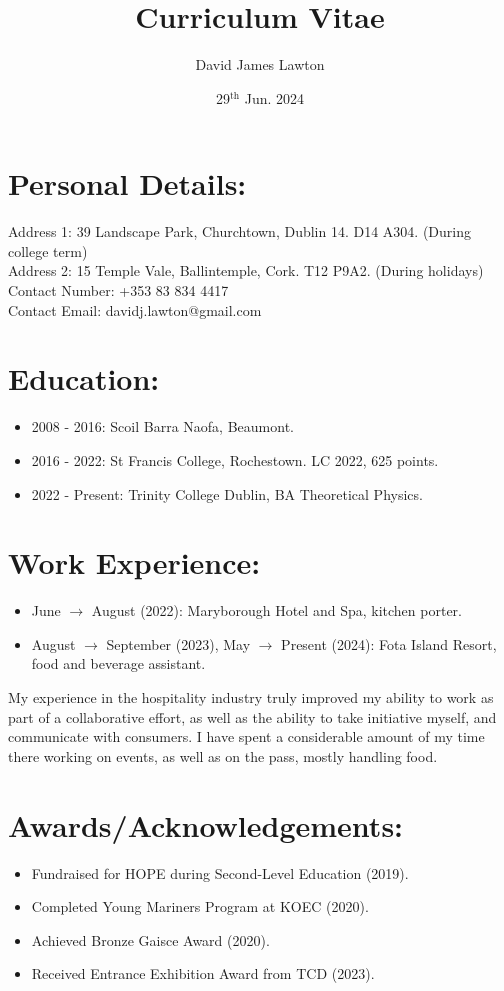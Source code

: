 \documentclass{article}
\title{Curriculum Vitae}
\author{David James Lawton}
\date{29$^\text{th}$ Jun. 2024}
\begin{document}
\maketitle

\section{Personal Details:}
Address 1: 39 Landscape Park, Churchtown, Dublin 14. D14 A304. (During college term)\\
Address 2: 15 Temple Vale, Ballintemple, Cork. T12 P9A2. (During holidays)\\
Contact Number: +353 83 834 4417\\
Contact Email: davidj.lawton@gmail.com\\

\section{Education:}
\begin{itemize}
\item 2008 - 2016: Scoil Barra Naofa, Beaumont.
\item 2016 - 2022: St Francis College, Rochestown. LC 2022, 625 points.
\item 2022 - Present: Trinity College Dublin, BA Theoretical Physics. 
\end{itemize}
\section{Work Experience:}
\begin{itemize}
\item June $\rightarrow$ August (2022): Maryborough Hotel and Spa, kitchen porter. 
\item August $\rightarrow$  September (2023), May $\rightarrow$ Present (2024): Fota Island Resort, food and beverage assistant.
\end{itemize}
My experience in the hospitality industry truly improved my ability to work as part of a collaborative effort, as well as the ability to take initiative myself, and communicate with consumers. I have spent a considerable amount of my time there working on events, as well as on the pass, mostly handling food.
\section{Awards/Acknowledgements:}
\begin{itemize}
\item Fundraised for HOPE during Second-Level Education (2019).
\item Completed Young Mariners Program at KOEC (2020).
\item Achieved Bronze Gaisce Award (2020).
\item Received Entrance Exhibition Award from TCD (2023).
\end{itemize}
\end{document}
